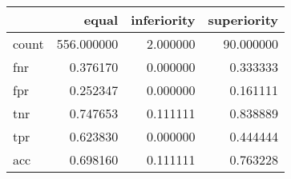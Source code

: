 \begin{tabular}{lrrr}
\toprule
{} &       equal &  inferiority &  superiority \\
\midrule
count &  556.000000 &     2.000000 &    90.000000 \\
fnr   &    0.376170 &     0.000000 &     0.333333 \\
fpr   &    0.252347 &     0.000000 &     0.161111 \\
tnr   &    0.747653 &     0.111111 &     0.838889 \\
tpr   &    0.623830 &     0.000000 &     0.444444 \\
acc   &    0.698160 &     0.111111 &     0.763228 \\
\bottomrule
\end{tabular}
